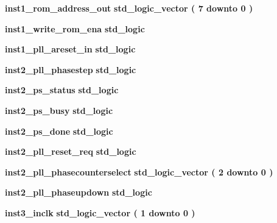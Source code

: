 \begin{DoxyCompactItemize}
\item 
{\bf inst1\+\_\+rom\+\_\+address\+\_\+out} {\bfseries \textcolor{comment}{std\+\_\+logic\+\_\+vector}\textcolor{vhdlchar}{ }\textcolor{vhdlchar}{(}\textcolor{vhdlchar}{ }\textcolor{vhdlchar}{ } \textcolor{vhdldigit}{7} \textcolor{vhdlchar}{ }\textcolor{keywordflow}{downto}\textcolor{vhdlchar}{ }\textcolor{vhdlchar}{ } \textcolor{vhdldigit}{0} \textcolor{vhdlchar}{ }\textcolor{vhdlchar}{)}\textcolor{vhdlchar}{ }} 
\item 
{\bf inst1\+\_\+write\+\_\+rom\+\_\+ena} {\bfseries \textcolor{comment}{std\+\_\+logic}\textcolor{vhdlchar}{ }} 
\item 
{\bf inst1\+\_\+pll\+\_\+areset\+\_\+in} {\bfseries \textcolor{comment}{std\+\_\+logic}\textcolor{vhdlchar}{ }} 
\item 
{\bf inst2\+\_\+pll\+\_\+phasestep} {\bfseries \textcolor{comment}{std\+\_\+logic}\textcolor{vhdlchar}{ }} 
\item 
{\bf inst2\+\_\+ps\+\_\+status} {\bfseries \textcolor{comment}{std\+\_\+logic}\textcolor{vhdlchar}{ }} 
\item 
{\bf inst2\+\_\+ps\+\_\+busy} {\bfseries \textcolor{comment}{std\+\_\+logic}\textcolor{vhdlchar}{ }} 
\item 
{\bf inst2\+\_\+ps\+\_\+done} {\bfseries \textcolor{comment}{std\+\_\+logic}\textcolor{vhdlchar}{ }} 
\item 
{\bf inst2\+\_\+pll\+\_\+reset\+\_\+req} {\bfseries \textcolor{comment}{std\+\_\+logic}\textcolor{vhdlchar}{ }} 
\item 
{\bf inst2\+\_\+pll\+\_\+phasecounterselect} {\bfseries \textcolor{comment}{std\+\_\+logic\+\_\+vector}\textcolor{vhdlchar}{ }\textcolor{vhdlchar}{(}\textcolor{vhdlchar}{ }\textcolor{vhdlchar}{ } \textcolor{vhdldigit}{2} \textcolor{vhdlchar}{ }\textcolor{keywordflow}{downto}\textcolor{vhdlchar}{ }\textcolor{vhdlchar}{ } \textcolor{vhdldigit}{0} \textcolor{vhdlchar}{ }\textcolor{vhdlchar}{)}\textcolor{vhdlchar}{ }} 
\item 
{\bf inst2\+\_\+pll\+\_\+phaseupdown} {\bfseries \textcolor{comment}{std\+\_\+logic}\textcolor{vhdlchar}{ }} 
\item 
{\bf inst3\+\_\+inclk} {\bfseries \textcolor{comment}{std\+\_\+logic\+\_\+vector}\textcolor{vhdlchar}{ }\textcolor{vhdlchar}{(}\textcolor{vhdlchar}{ }\textcolor{vhdlchar}{ } \textcolor{vhdldigit}{1} \textcolor{vhdlchar}{ }\textcolor{keywordflow}{downto}\textcolor{vhdlchar}{ }\textcolor{vhdlchar}{ } \textcolor{vhdldigit}{0} \textcolor{vhdlchar}{ }\textcolor{vhdlchar}{)}\textcolor{vhdlchar}{ }} 

\end{DoxyCompactItemize}
